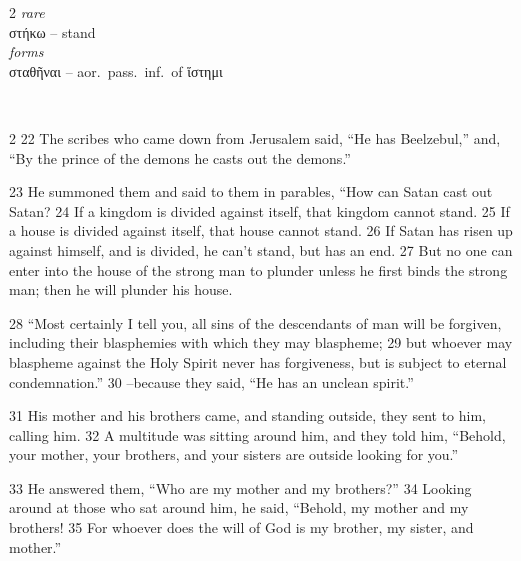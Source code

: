 \documentclass[10pt,a5paper,twoside,twocolumn]{book}
\newcommand{\newchapter}{\stepcounter{chapter}}
\newcommand*\cleartoleftpage{%
  \ifodd\value{page}\hbox{}\clearpage\fi
}
\newcommand{\separator}{
  \vspace{-0.5\baselineskip}%
  \hspace{0.27\textwidth}%
  \noindent\makebox[\linewidth]{\resizebox{0.3333\linewidth}{1pt}{$\bullet$}}\bigskip%
  \vspace{-0.5\baselineskip}
}
\newenvironment{facing}{\cleartoleftpage}{\clearpage\pagebreak}
\newenvironment{help}{\clearpage}{}
\newenvironment{helpsec}{\begin{minipage}[t]{\textwidth}\begin{multicols}{2}}{\end{multicols}\end{minipage}}
\newenvironment{vocab}{\begin{helpsec}}{\end{helpsec}}
\newenvironment{translation}{\separator\\\begin{helpsec}\footnotesize}{\end{helpsec}}
\begin{document}
\begin{facing}
\begin{help}
\begin{vocab}
\emph{rare}\\
στήκω -- stand\\

\emph{forms}\\
σταθῆναι -- aor.~pass.~inf.~of ἵστημι\\
\end{vocab}
\begin{translation}
22 The scribes who came down from Jerusalem said, ``He has Beelzebul,'' and, ``By the prince of the demons he casts out the demons.''

23 He summoned them and said to them in parables, ``How can Satan cast out Satan? 24  If a kingdom is divided against itself, that kingdom cannot stand. 25  If a house is divided against itself, that house cannot stand. 26  If Satan has risen up against himself, and is divided, he can't stand, but has an end. 27  But no one can enter into the house of the strong man to plunder unless he first binds the strong man; then he will plunder his house.

28  ``Most certainly I tell you, all sins of the descendants of man will be forgiven, including their blasphemies with which they may blaspheme; 29  but whoever may blaspheme against the Holy Spirit never has forgiveness, but is subject to eternal condemnation.'' 30 --because they said, ``He has an unclean spirit.''

31 His mother and his brothers came, and standing outside, they sent to him, calling him. 32 A multitude was sitting around him, and they told him, ``Behold, your mother, your brothers, and your sisters are outside looking for you.''

33 He answered them, ``Who are my mother and my brothers?'' 34 Looking around at those who sat around him, he said, ``Behold, my mother and my brothers! 35  For whoever does the will of God is my brother, my sister, and mother.'' 

\end{translation}
\end{help}
\end{facing}


\newchapter
\end{document}
